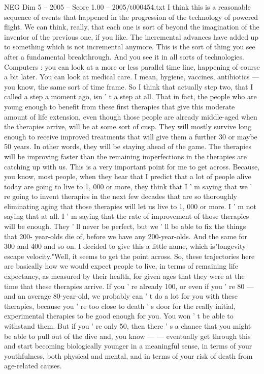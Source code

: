 \begin{textsample}{NEG Dim 5 – 2005 – Score 1.00 – 2005/t000454.txt}
I think this is a reasonable sequence of events that happened in the progression of the technology of powered flight.
We can think, really, that each one is sort of beyond the imagination of the inventor of the previous one, if you like.
The incremental advances have added up to something which is not incremental anymore.
This is the sort of thing you see after a fundamental breakthrough.
And you see it in all sorts of technologies.
Computers : you can look at a more or less parallel time line, happening of course a bit later.
You can look at medical care.
I mean, hygiene, vaccines, antibiotics — you know, the same sort of time frame.
So I think that actually step two, that I called a step a moment ago, isn ' t a step at all.
That in fact, the people who are young enough to benefit from these first therapies that give this moderate amount of life extension, even though those people are already middle-aged when the therapies arrive, will be at some sort of cusp.
They will mostly survive long enough to receive improved treatments that will give them a further 30 or maybe 50 years.
In other words, they will be staying ahead of the game.
The therapies will be improving faster than the remaining imperfections in the therapies are catching up with us.
This is a very important point for me to get across.
Because, you know, most people, when they hear that I predict that a lot of people alive today are going to live to 1, 000 or more, they think that I ' m saying that we ' re going to invent therapies in the next few decades that are so thoroughly eliminating aging that those therapies will let us live to 1, 000 or more.
I ' m not saying that at all.
I ' m saying that the rate of improvement of those therapies will be enough.
They ' ll never be perfect, but we ' ll be able to fix the things that 200- year-olds die of, before we have any 200-year-olds.
And the same for 300 and 400 and so on.
I decided to give this a little name, which is"longevity escape velocity."Well, it seems to get the point across.
So, these trajectories here are basically how we would expect people to live, in terms of remaining life expectancy, as measured by their health, for given ages that they were at the time that these therapies arrive.
If you ' re already 100, or even if you ' re 80 — and an average 80-year-old, we probably can ' t do a lot for you with these therapies, because you ' re too close to death ' s door for the really initial, experimental therapies to be good enough for you.
You won ' t be able to withstand them.
But if you ' re only 50, then there ' s a chance that you might be able to pull out of the dive and, you know — — eventually get through this and start becoming biologically younger in a meaningful sense, in terms of your youthfulness, both physical and mental, and in terms of your risk of death from age-related causes.

\end{textsample}
